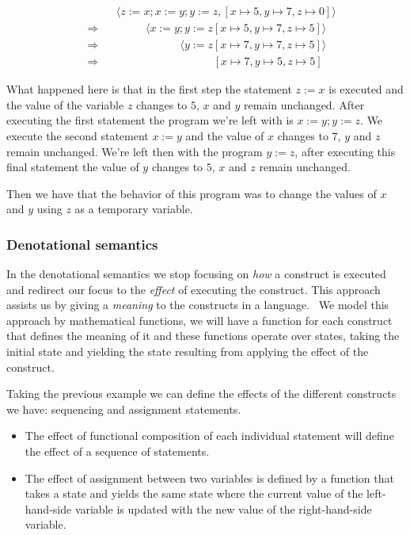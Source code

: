 \begin{equation*}
\begin{split}
& \phantom{\Rightarrow} \phantom{=} \langle z:=x; x:=y; y:=z, [x\mapsto5, y\mapsto7, z\mapsto0]\rangle\\
& \Rightarrow \phantom{=} \phantom{z:=x} \langle x:=y; y:=z [x\mapsto5, y\mapsto7, z\mapsto5]\rangle\\
& \Rightarrow \phantom{=} \phantom{z:=x; x:=y} \langle y:=z [x\mapsto7, y\mapsto7, z\mapsto5]\rangle\\
& \Rightarrow \phantom{=} \phantom{z:=x; x:=y; y:=z} [x\mapsto7, y\mapsto5, z\mapsto5]
\end{split}
\end{equation*}

What happened here is that in the first step the statement $z:=x$ is executed and the value of the variable $z$ changes to $5$, $x$ and $y$ remain unchanged.
After executing the first statement the program we're left with is $x:=y; y:=z$.
We execute the second statement $x:=y$ and the value of $x$ changes to $7$, $y$ and $z$ remain unchanged.
We're left then with the program $y:=z$, after executing this final statement the value of $y$ changes to $5$, $x$ and $z$ remain unchanged.

Then we have that the behavior of this program was to change the values of $x$ and $y$ using $z$ as a temporary variable.


\subsubsection{Denotational semantics}
In the denotational semantics we stop focusing on \textit{how} a construct is executed and redirect our focus to the \textit{effect} of executing the construct.
This approach assists us by giving a \textit{meaning} to the constructs in a language.~\parencite{nipkow}
We model this approach by mathematical functions, we will have a function for each construct that defines the meaning of it and these functions operate over states, taking the initial state and yielding the state resulting from applying the effect of the construct.

Taking the previous example we can define the effects of the different constructs we have: sequencing and assignment statements.

\begin{itemize}
\item{The effect of functional composition of each individual statement will define the effect of a sequence of statements.}
\item{The effect of assignment between two variables is defined by a function that takes a state and yields the same state where the current value of the left-hand-side variable is updated with the new value of the right-hand-side variable.}
\end{itemize}

